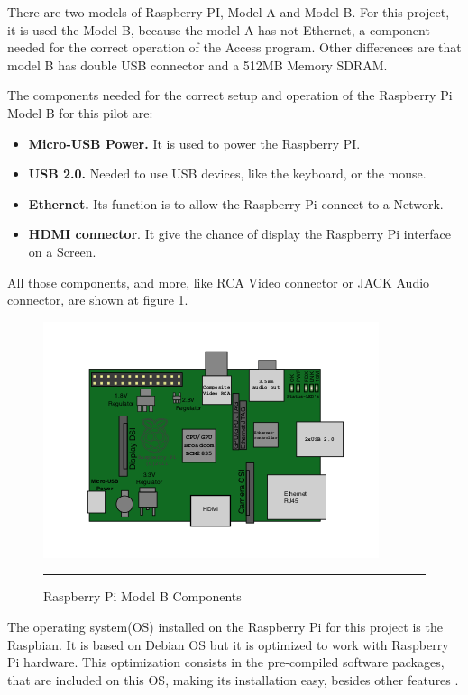 \documentclass[12pt, a4paper,twoside]{tesi_upf}
\begin{document}
There are two models of Raspberry PI, Model A and Model B. For this project, it is used the Model B, because the model A has not Ethernet, a component needed for the correct operation of the Access program. Other differences are that model B has double USB connector and a 512MB Memory SDRAM.

    The components needed for the correct setup and operation of the Raspberry Pi Model B for this pilot are:
        \begin{itemize}
        \item \textbf{Micro-USB Power.} It is used to power the Raspberry PI. 
        \item \textbf{USB 2.0.} Needed to use USB devices, like the keyboard, or the mouse.
        \item \textbf{Ethernet.} Its function is to allow the Raspberry Pi connect to a Network.
        \item \textbf{HDMI connector}. It give the chance of display the Raspberry Pi interface on a Screen.
        \end{itemize}
        
    All those components, and more, like RCA Video connector or JACK Audio connector, are shown at figure \ref{fig:raspelem}.
        
        \begin{figure}[htbp]
          \centering
              \includegraphics[scale=1]{./figures/Raspelem.png}
              \rule{32em}{0.7pt}
          \caption[Raspberry Pi Model B Components]{Raspberry Pi Model B Components}
          \label{fig:raspelem}
        \end{figure}
        
The operating system(OS) installed on the Raspberry Pi for this project is the Raspbian. It is based on Debian OS but it is optimized to work with Raspberry Pi hardware. This optimization consists in the pre-compiled software packages, that are included on this OS, making its installation easy, besides other features \cite{raspbian}.
        
\end{document}
